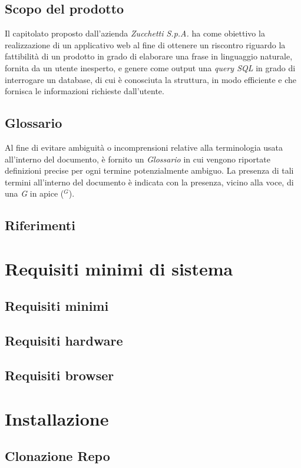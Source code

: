 \documentclass[5pt]{article}
\begin{document}
	\subsection{Scopo del prodotto}
     Il capitolato proposto dall'azienda \textit{Zucchetti S.p.A.} ha come obiettivo la realizzazione di un applicativo web al fine di ottenere un riscontro riguardo la fattibilità di un prodotto in grado di elaborare una frase in linguaggio naturale, fornita da un utente inesperto, e genere come output una \textit{query SQL} in grado di interrogare un database, di cui è conosciuta la struttura, in modo efficiente e che fornisca le informazioni richieste dall'utente.

        \subsection{Glossario}
     Al fine di evitare ambiguità o incomprensioni relative alla terminologia usata all'interno del documento, è fornito un \textit{Glossario} in cui vengono riportate definizioni precise per ogni termine potenzialmente ambiguo. La presenza di tali termini all'interno del documento è indicata con la presenza, vicino alla voce, di una \textit{G} in apice ($^G$). 

        \subsection{Riferimenti}


	\section{Requisiti minimi di sistema}
        \subsection{Requisiti minimi}
        \subsection{Requisiti hardware}
        \subsection{Requisiti browser}
	
	\section{Installazione}
        \subsection{Clonazione Repo}
 
\end{document}
